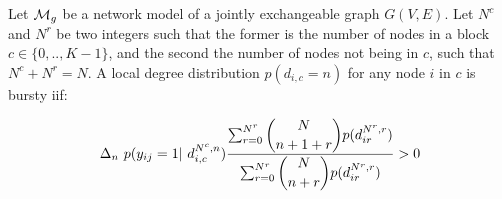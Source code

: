 \begin{theorem} \label{th:burst_local}
    Let $\mathcal{M}_g$ be a network model of a jointly exchangeable graph $G(V,E)$. Let $N^c$ and $N^r$ be two integers such that the former is the number of nodes in a block $c \in \{0,.., K-1\}$, and the second the number of nodes not being in $c$, such that $N^c+N^r = N$. A local degree distribution $p(d_{i,c}=n)$ for any node $i$ in $c$ is bursty iif:
	
\begin{equation}
\Delta_n\   p(y_{ij}=1 | d_{i,c}^{N^c,n}) \frac{\sum_{r=0}^{N^r}\dbinom{N}{n+1+r} p(d_{ir}^{N^r,r})}{\sum_{r=0}^{N^r} \dbinom{N}{n+r} p(d_{ir}^{N^r,r}) } > 0
\end{equation}
	
\end{theorem}

